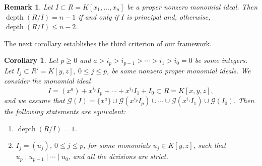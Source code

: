 \documentclass[11pt]{amsart}
\newtheorem{corollary}[theorem]{Corollary}
\newtheorem{remark}[theorem]{Remark}
\def\depth{\operatorname{depth}}
\begin{document}

\begin{remark}\label{rem1}
Let $I\subset R=K[x_1,\ldots,x_n]$ be a proper  nonzero  monomial ideal. Then $\depth(R/I)=n-1$ if and only if $I$ is principal and, otherwise, $\depth(R/I)\leq n-2$.
\end{remark}




The next corollary  establishes the third criterion of our framework.

\begin{corollary}\label{p1}
Let $p\geq 0$ and $a>i_p>i_{p-1}>\cdots>i_1>i_0=0$ be some integers. Let $I_j\subset R'=K[y,z]$, $0\leq j\leq p$, be some nonzero 
proper monomial ideals. We consider the monomial ideal $$I=(x^a)+x^{i_p}I_p + \cdots + x^{i_1}I_1  +  I_0 \subset R=K[x,y,z],$$
 and we assume that
$\mathcal{G}(I)=\{x^a\}\cup \mathcal{G}(x^{i_p}I_p) \cup \cdots \cup  \mathcal{G}(x^{i_1}I_1)    \cup       \mathcal{G}(I_0).$
Then the following statements are equivalent:
\begin{enumerate}
\item[(1)] $\depth(R/I)=1$.
\item[(2)] $I_j=(u_j)$, $0\leq j\leq p$, for some monomials $u_j\in K[y,z]$, such that $u_p \mid u_{p-1} \mid \cdots \mid u_0$,
           and all the divisions are strict.
\end{enumerate}
\end{corollary}
\end{document}
